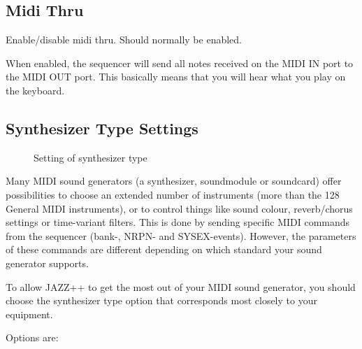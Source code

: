 \documentclass[letterpaper]{report}
\begin{document}
\subsection{Midi Thru}
Enable/disable midi thru. Should normally be enabled.

When enabled, the sequencer will send all notes received on
the MIDI IN port to the MIDI OUT port. This basically means that you will hear
what you play on the keyboard.

\subsection{Synthesizer Type Settings}\label{synthtype}

\begin{figure}
\caption{Setting of synthesizer type}
\end{figure}

Many MIDI sound generators (a synthesizer, soundmodule or soundcard) offer
possibilities to choose an extended number of instruments (more than
the 128 General MIDI instruments), or to control things like sound colour,
reverb/chorus settings or time-variant filters. This is done by sending
specific MIDI commands from the sequencer
(bank-, NRPN- and SYSEX-events). However, the parameters of
these commands are different depending on which standard your sound
generator supports.

To allow JAZZ++ to get the most out of your MIDI sound generator, you should
choose the synthesizer type option that corresponds most closely to your
equipment.

Options are:
\end{document}
